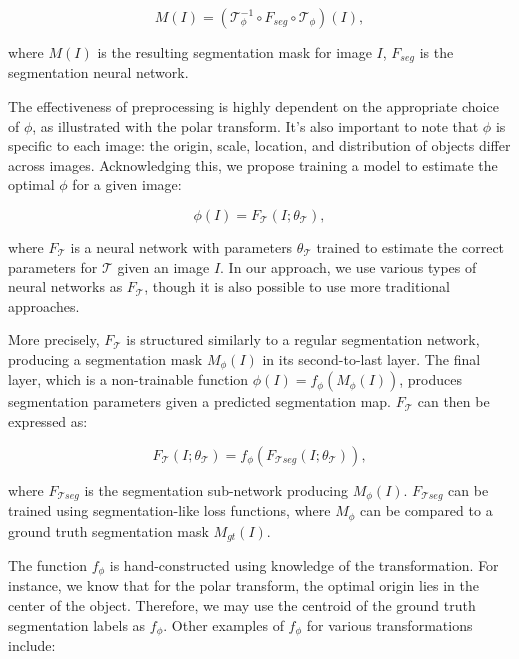 \begin{equation}
	M(I) = (\mathcal{T}_{\phi}^{-1} \circ F_{seg} \circ \mathcal{T}_{\phi})(I),
\end{equation}

where $M(I)$ is the resulting segmentation mask for image $I$, $F_{seg}$ is the segmentation neural network. 

The effectiveness of preprocessing is highly dependent on the appropriate choice of \(\phi\), as illustrated with the polar transform. It's also important to note that \(\phi\) is specific to each image: the origin, scale, location, and distribution of objects differ across images. Acknowledging this, we propose training a model to estimate the optimal \(\phi\) for a given image:

\begin{equation}
	\phi(I) = F_{\mathcal{T}}(I; \theta_{\mathcal{T}}),
\end{equation}

where $F_{\mathcal{T}}$ is a neural network with parameters $\theta_{\mathcal{T}}$ trained to estimate the correct parameters for $\mathcal{T}$ given an image $I$. In our approach, we use various types of neural networks as $F_{\mathcal{T}}$, though it is also possible to use more traditional approaches.

More precisely, $F_{\mathcal{T}}$ is structured similarly to a regular segmentation network, producing a segmentation mask $M_\phi(I)$ in its second-to-last layer. The final layer, which is a non-trainable function $\phi(I) = f_\phi(M_\phi(I))$, produces segmentation parameters given a predicted segmentation map. $F_{\mathcal{T}}$ can then be expressed as:

\begin{equation}
	F_{\mathcal{T}}(I; \theta_{\mathcal{T}}) = f_\phi(F_{\mathcal{T}seg}(I; \theta_{\mathcal{T}})),
\end{equation}

where $F_{\mathcal{T}seg}$ is the segmentation sub-network producing $M_\phi(I)$. $F_{\mathcal{T}seg}$ can be trained using segmentation-like loss functions, where $M_\phi$ can be compared to a ground truth segmentation mask $M_{gt}(I)$. 

The function $f_\phi$ is hand-constructed using knowledge of the transformation. For instance, we know that for the polar transform, the optimal origin lies in the center of the object. Therefore, we may use the centroid of the ground truth segmentation labels as $f_\phi$. Other examples of \( f_\phi \) for various transformations include:

